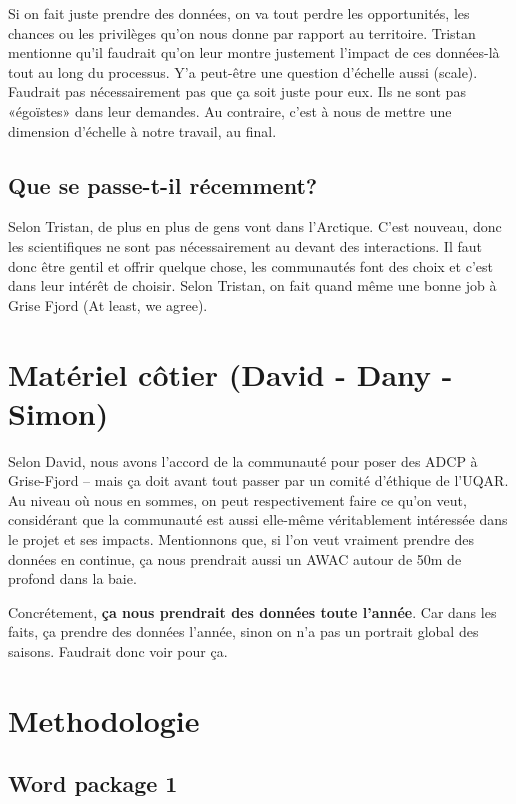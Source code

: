 \documentclass[10pt]{article}
\numberwithin{equation}{section}
\begin{document}
Si on fait juste prendre des données, on va tout perdre les opportunités, les chances ou les privilèges qu'on nous donne par rapport au territoire.
Tristan mentionne qu'il faudrait qu'on leur montre justement l'impact de ces données-là tout au long du processus.
Y'a peut-être une question d'échelle aussi (scale). Faudrait pas nécessairement pas que ça soit juste pour eux. Ils ne sont pas «égoïstes» dans leur demandes. Au contraire, c'est à nous de mettre une dimension d'échelle à notre travail, au final. 
\subsection{Que se passe-t-il récemment?}
\label{sec:org50f065c}

Selon Tristan, de plus en plus de gens vont dans l'Arctique. C'est nouveau, donc les scientifiques ne sont pas nécessairement au devant des interactions. Il faut donc être gentil et offrir quelque chose, les communautés font des choix et c'est dans leur intérêt de choisir. 
Selon Tristan, on fait quand même une bonne job à Grise Fjord (At least, we agree).
\section{Matériel côtier (David - Dany - Simon)}
\label{sec:orgf2cda3b}

Selon David, nous avons l'accord de la communauté pour poser des ADCP à Grise-Fjord -- mais ça doit avant tout passer par un comité d'éthique de l'UQAR. Au niveau où nous en sommes, on peut respectivement faire ce qu'on veut, considérant que la communauté est aussi elle-même véritablement intéressée dans le projet et ses impacts. Mentionnons que, si l'on veut vraiment prendre des données en continue,  ça nous prendrait aussi un AWAC autour de 50m de profond dans la baie. 

Concrétement, \textbf{ça nous prendrait des données toute l'année}. Car dans les faits, ça prendre des données
l'année, sinon on n'a pas un portrait global des saisons. Faudrait donc voir pour ça. 
\section{Methodologie}
\label{sec:org510477b}

\subsection{Word package 1}
\label{sec:org8b2f29e}
\end{document}
